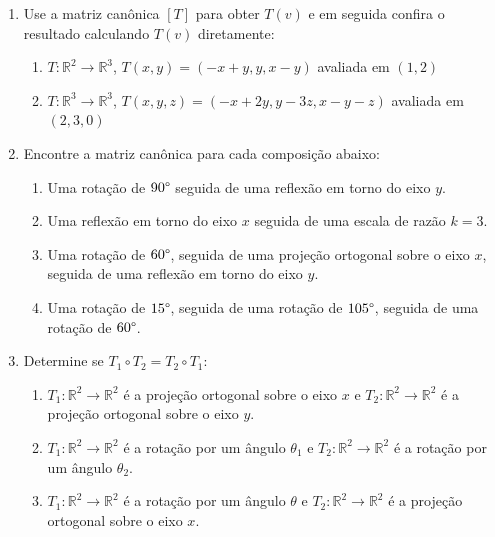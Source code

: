 \documentclass[a4paper,5pt]{amsbook}
\begin{document}
\begin{enumerate}
	\vspace{0.5cm}
	\item Use a matriz can\^onica $[T]$ para obter $T(v)$ e em seguida confira
		o resultado calculando $T(v)$ diretamente:
		\begin{enumerate}
			\item $T: \mathbb{R}^2 \rightarrow \mathbb{R}^3$, $T(x,y) = (-x+y,
				y, x-y)$ avaliada em $(1,2)$
			\item $T: \mathbb{R}^3 \rightarrow \mathbb{R}^3$, $T(x,y,z) =
				(-x+2y, y-3z, x-y-z)$ avaliada em $(2,3,0)$
		\end{enumerate}

	\vspace{0.5cm}
	\item Encontre a matriz can\^onica para cada composi\c{c}\~ao abaixo:
		\begin{enumerate}
			\item Uma rota\c{c}\~ao de $90\degree$ seguida de uma reflex\~ao em torno
				do eixo $y$.
			\item Uma reflex\~ao em torno do eixo $x$ seguida de uma escala de
				raz\~ao $k=3$.
			\item Uma rota\c{c}\~ao de $60\degree$, seguida de uma proje\c{c}\~ao ortogonal
				sobre o eixo $x$, seguida de uma reflex\~ao em torno do eixo $y$.
			\item Uma rota\c{c}\~ao de $15\degree$, seguida de uma rota\c{c}\~ao de
				$105\degree$, seguida de uma rota\c{c}\~ao de $60\degree$.
		\end{enumerate}

	\vspace{0.5cm}
	\item Determine se $T_1\circ T_2 = T_2 \circ T_1$:
		\begin{enumerate}
			\item $T_1:\mathbb{R}^2 \rightarrow \mathbb{R}^2$ \'e a proje\c{c}\~ao
				ortogonal sobre o eixo $x$ e $T_2: \mathbb{R}^2 \rightarrow
				\mathbb{R}^2$ \'e a proje\c{c}\~ao ortogonal sobre o eixo $y$.
			\item $T_1:\mathbb{R}^2 \rightarrow \mathbb{R}^2$ \'e a rota\c{c}\~ao por
				um \^angulo $\theta_1$ e $T_2: \mathbb{R}^2 \rightarrow
				\mathbb{R}^2$ \'e a rota\c{c}\~ao por um \^angulo $\theta_2$.
			\item $T_1:\mathbb{R}^2 \rightarrow \mathbb{R}^2$ \'e a rota\c{c}\~ao por
				um \^angulo $\theta$ e $T_2: \mathbb{R}^2 \rightarrow
				\mathbb{R}^2$ \'e a proje\c{c}\~ao ortogonal sobre o eixo $x$.
		\end{enumerate}


\end{enumerate}
\end{document}
